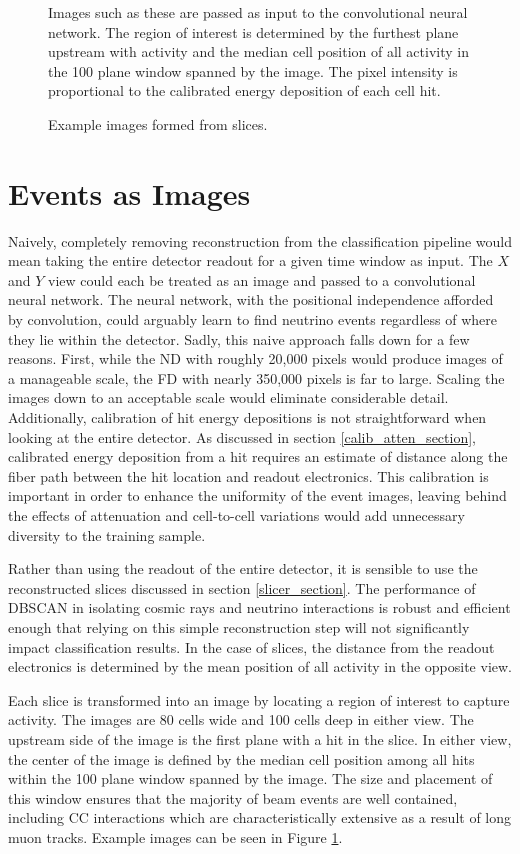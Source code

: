 \begin{figure}[t]
\caption{Example images formed from \nova slices.}{
Images such as these are passed as input to the convolutional neural network.
The region of interest is determined by the furthest plane upstream with
activity and the median cell position of all activity
in the 100 plane window spanned by the image.
The pixel intensity is proportional to the calibrated energy deposition
of each cell hit.}
\label{pixelmap}
\end{figure}
\clearpage

\section{\nova Events as Images}

Naively, completely removing reconstruction from the classification pipeline
would mean taking the entire detector readout for a given time window
as input.  The $X$ and $Y$ view could each be treated as an image and passed
to a convolutional neural network.
The neural network, with the positional independence afforded by convolution,
could arguably learn to find neutrino events regardless of where they lie
within the detector.
Sadly, this naive approach falls down for a few reasons.
First, while the ND with roughly 20,000 pixels would produce images of a
manageable scale, the FD with nearly 350,000 pixels is far to large.
Scaling the images down to an acceptable scale would eliminate considerable
detail.
Additionally, calibration of hit energy depositions is not straightforward
when looking at the entire detector.
As discussed in section \ref{calib_atten_section}, calibrated energy deposition
from a hit requires an estimate of distance along the fiber path
between the hit location and readout electronics.
This calibration is important in order to enhance the uniformity of the
event images, leaving behind the effects of attenuation and cell-to-cell
variations would add unnecessary diversity to the training sample.

Rather than using the readout of the entire detector, it is sensible to use
the reconstructed slices discussed in section \ref{slicer_section}.
The performance of DBSCAN in isolating cosmic rays and neutrino interactions
is robust and efficient enough \cite{baird2015thesis} that relying on this
simple reconstruction step will not significantly impact classification
results.
In the case of slices, the distance from the readout electronics is determined
by the mean position of all activity in the opposite view.

Each slice is transformed into an image by locating a region of interest to
capture activity.  The images are 80 cells wide and 100 cells deep in either
view.
The upstream side of the image is the first plane with a hit
in the slice.  In either view, the center of the image is defined by the
median cell position among all hits within the 100 plane window spanned by the
image.
The size and placement of this window ensures that the majority of beam events
are well contained, including \numu CC interactions which are
characteristically extensive as a result of long muon tracks.
Example images can be seen in Figure \ref{pixelmap}.

